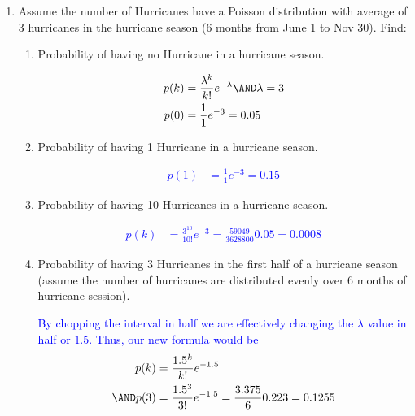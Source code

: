\documentclass[10pt,a4paper]{report}
\newcommand{\BLUE}[1]{\textcolor{blue}{#1}}
\begin{document}
\begin{enumerate}
\begin{enumerate}
	\end{enumerate}

	\newpage
	\item Assume the number of Hurricanes have a Poisson distribution with average of 3 hurricanes in the hurricane season (6 months from June 1 to Nov 30). Find:

	\begin{enumerate}

		\item Probability of having no Hurricane in a hurricane season.
		
		\BLUE{\begin{align*}
			p(k) &= \frac{\lambda^k}{k!}e^{-\lambda} \AND \lambda = 3\\
			p(0) &= \frac{1}{1}e^{-3} = 0.05
		\end{align*}
		}

		\item Probability of having 1 Hurricane in a hurricane season.
		
		\BLUE{\begin{align*}
			p(1) &= \frac{1}{1} e^{-3} = 0.15
		\end{align*}
		}

		\item Probability of having 10 Hurricanes in a hurricane season.
		
		\BLUE{\begin{align*}
			p(k) &= \frac{3^{10}}{10!}e^{-3} = \frac{59049}{3628800}0.05 = 0.0008
		\end{align*}
		}

		\item Probability of having 3 Hurricanes in the first half of a hurricane season (assume the number of hurricanes are distributed evenly over 6 months of hurricane session).
		
		\BLUE{By chopping the interval in half we are effectively changing the $\lambda$ value in half or $1.5$.  Thus, our new formula would be 
		\begin{align*}
			p(k) &= \frac{1.5^k}{k!}e^{-1.5} \\
			\AND p(3) &= \frac{1.5^3}{3!}e^{-1.5} = \frac{3.375}{6}0.223 = 0.1255 
		\end{align*}
		}

\end{enumerate}
\end{enumerate}
\end{document}
